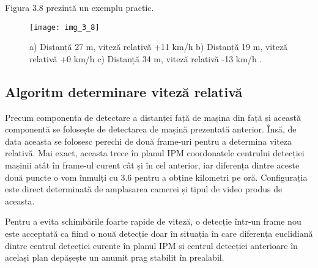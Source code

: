 Figura 3.8 prezintă un exemplu practic.
\begin{figure}[!h]
	\centering
	\texttt{[image: img\_3\_8]}
	\caption[Determinare distanță și viteză]{a) Distanță 27 m, viteză relativă +11 km/h b) Distanță 19 m, viteză relativă +0 km/h c) Distanță 34 m, viteză relativă -13 km/h .}
\end{figure}

\subsection*{Algoritm determinare viteză relativă}

Precum componenta de detectare a distanței față de mașina din față și această componentă se folosește de detectarea de mașină prezentată anterior. Însă, de data aceasta se folosesc perechi de două frame-uri pentru a determina viteza relativă. Mai exact, aceasta trece în planul IPM coordonatele centrului detecției mașinii atât în frame-ul curent cât și în cel anterior, iar diferența dintre aceste două puncte o vom înmulți cu 3.6 pentru a obține kilometri pe oră. Configurația este direct determinată de amplasarea camerei și tipul de video produs de aceasta. 

Pentru a evita schimbările foarte rapide de viteză, o detecție într-un frame nou este acceptată ca fiind o nouă detecție doar în situația în care diferența euclidiană dintre centrul detecției curente în planul IPM și centrul detecției anterioare în același plan depășește un anumit prag stabilit în prealabil.